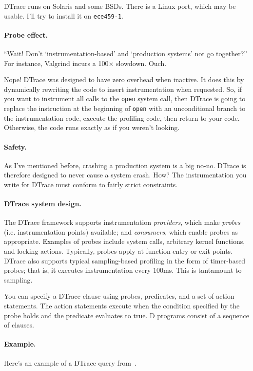 \documentclass[a4paper]{report}
\begin{document}
DTrace runs on Solaris and some BSDs. There is a Linux port, which may be usable.
I'll try to install it on {\tt ece459-1}.

\paragraph{Probe effect.} ``Wait! Don't `instrumentation-based' 
and `production systems' not go together?'' For instance, Valgrind incurs a 100$\times$
slowdown. Ouch.

Nope! DTrace was designed to have zero overhead when inactive. It does
this by dynamically rewriting the code to insert instrumentation when
requested. So, if you want to instrument all calls to the {\tt open}
system call, then DTrace is going to replace the instruction at the
beginning of {\tt open} with an unconditional branch to the
instrumentation code, execute the profiling code, then return to your
code. Otherwise, the code runs exactly as if you weren't looking.

\paragraph{Safety.} As I've mentioned before, crashing a production
system is a big no-no. DTrace is therefore designed to never cause a
system crash. How? The instrumentation you write for DTrace 
must conform to fairly strict constraints.

\paragraph{DTrace system design.} The DTrace framework supports instrumentation
\emph{providers}, which make \emph{probes} (i.e.  instrumentation
points) available; and \emph{consumers}, which enable probes as
appropriate. Examples of probes include system calls, arbitrary kernel
functions, and locking actions. Typically, probes apply at function entry or exit points.
DTrace also supports typical
sampling-based profiling in the form of timer-based probes; that is,
it executes instrumentation every 100ms. This is tantamount to
sampling.

You can specify a DTrace clause using probes, predicates, and a set of
action statements. The action statements execute when the condition
specified by the probe holds and the predicate evaluates to true. D
programs consist of a sequence of clauses.

\paragraph{Example.} Here's an example of a DTrace query from~\cite{Cantrill:2004:DIP:1247415.1247417}.
\end{document}
